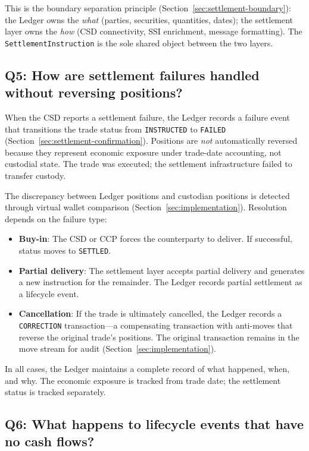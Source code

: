 \documentclass[11pt,a4paper]{article}
\begin{document}
This is the boundary separation principle (Section~\ref{sec:settlement-boundary}): the Ledger owns the \emph{what} (parties, securities, quantities, dates); the settlement layer owns the \emph{how} (CSD connectivity, SSI enrichment, message formatting). The \texttt{SettlementInstruction} is the sole shared object between the two layers.

\subsection*{Q5: How are settlement failures handled without reversing positions?}

When the CSD reports a settlement failure, the Ledger records a failure event that transitions the trade status from \texttt{INSTRUCTED} to \texttt{FAILED} (Section~\ref{sec:settlement-confirmation}). Positions are \emph{not} automatically reversed because they represent economic exposure under trade-date accounting, not custodial state. The trade was executed; the settlement infrastructure failed to transfer custody.

The discrepancy between Ledger positions and custodian positions is detected through virtual wallet comparison (Section~\ref{sec:implementation}). Resolution depends on the failure type:

\begin{itemize}[nosep]
\item \textbf{Buy-in}: The CSD or CCP forces the counterparty to deliver. If successful, status moves to \texttt{SETTLED}.
\item \textbf{Partial delivery}: The settlement layer accepts partial delivery and generates a new instruction for the remainder. The Ledger records partial settlement as a lifecycle event.
\item \textbf{Cancellation}: If the trade is ultimately cancelled, the Ledger records a \texttt{CORRECTION} transaction---a compensating transaction with anti-moves that reverse the original trade's positions. The original transaction remains in the move stream for audit (Section~\ref{sec:implementation}).
\end{itemize}

\noindent In all cases, the Ledger maintains a complete record of what happened, when, and why. The economic exposure is tracked from trade date; the settlement status is tracked separately.

\subsection*{Q6: What happens to lifecycle events that have no cash flows?}
\end{document}
